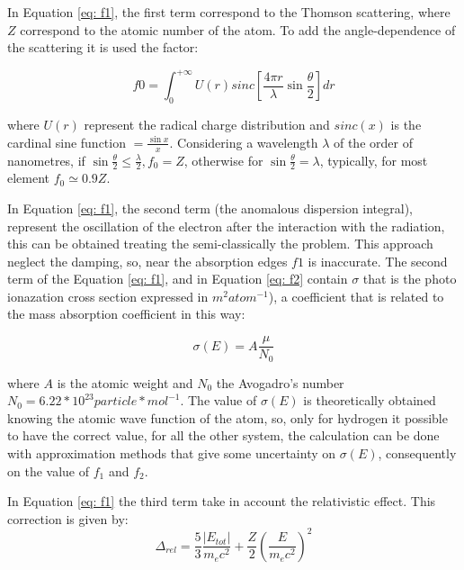 \begin{flushleft}
In Equation \ref{eq: f1}, the first term correspond to the Thomson scattering, where $Z $ correspond to the atomic number of the atom. To add the angle-dependence of the scattering it is used the factor:
\end{flushleft}

\begin{equation}
f0 = \int_{0}^{+ \infty} U(r) sinc[\frac{4 \pi r}{\lambda} \sin \frac{\theta}{2}] dr
\label{f0}
\end{equation}

\begin{flushleft}
where $U(r) $ represent the radical charge distribution and $sinc(x)$ is the cardinal sine function $ = \frac{\sin x}{x} $. Considering a wavelength $\lambda $ of the order of nanometres, if $\sin \frac{\theta}{2} \leq \frac{\lambda}{2}, f_0=Z $, otherwise for $\sin \frac{\theta}{2}=\lambda$, typically, for most element $ f_0 \simeq 0.9Z $.
\end{flushleft}
In Equation \ref{eq: f1}, the second term (the anomalous dispersion integral), represent the oscillation of the electron after the interaction with the radiation, this can be obtained treating the semi-classically the problem. This approach neglect the damping, so, near the absorption edges $f1 $ is inaccurate. The second term of the Equation \ref{eq: f1}, and in Equation \ref{eq: f2} contain $\sigma $ that is the photo ionazation cross section expressed in $m^2 atom ^{-1} $), a coefficient that is related to the mass absorption coefficient in this way: 

\begin{equation}
\sigma(E) = A \frac{\mu}{N_0}
\label{eq: sigma}
\end{equation}

\begin{flushleft}
where $A $ is the atomic weight and $N_0 $ the Avogadro's number $N_0 = 6.22 * 10^{23} particle*mol^{-1} $. The value of $\sigma(E) $ is theoretically obtained knowing the atomic wave function of the atom, so, only for hydrogen it possible to have the correct value, for all the other system, the calculation can be done with approximation methods that give some uncertainty on $\sigma(E) $, consequently on the value of $f_1 $ and $f_2 $.
\end{flushleft}
In Equation \ref{eq: f1} the third term take in account the relativistic effect. This correction is given by:
\begin{equation}
\Delta_{rel} = \frac{5}{3} \frac{|E_{tot}|}{m_e c^2} + \frac{Z}{2} \left( \frac{E}{m_e c^2} \right)^2
\label{eq: Delta_rel}
\end{equation}

